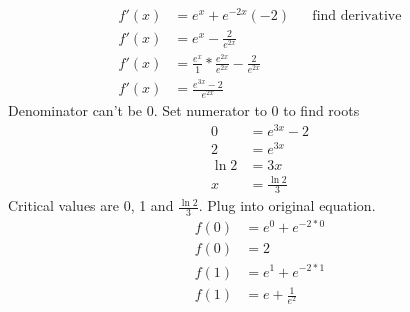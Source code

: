 \documentclass{article}
\begin{document}
\begin{description}
\begin{description}
                    \begin{align*}
                        f'(x) & = e^x + e^{-2x}(-2)                                        &  & \text{find derivative} \\
                        f'(x) & = e^x - \frac{2}{e^{2x}}                                                               \\
                        f'(x) & = \frac{e^x}{1} * \frac{e^{2x}}{e^{2x}} - \frac{2}{e^{2x}}                             \\
                        f'(x) & = \frac{e^{3x} - 2}{e^{2x}}
                    \end{align*}
                    Denominator can't be 0. Set numerator to 0 to find roots
                    \begin{align*}
                        0      & = e^{3x} - 2       \\
                        2      & = e^{3x}           \\
                        \ln{2} & = 3x               \\
                        x      & = \frac{\ln{2}}{3}
                    \end{align*}
                    Critical values are 0, 1 and $\frac{\ln{2}}{3}$. Plug into original equation.
                    \begin{align*}
                        f(0)                           & = e^0 + e^{-2* 0}                                                                                                                                                                                                    \\
                        f(0)                           & = 2                                                                                                                                                                                                                  \\[2em]
                        f(1)                           & = e^1 + e^{-2 * 1}                                                                                                                                                                                                   \\
                        f(1)                           & = e + \frac{1}{e^2}                                                                                                                                                                                                  \\

\end{align*}
\end{description}
\end{description}
\end{document}

